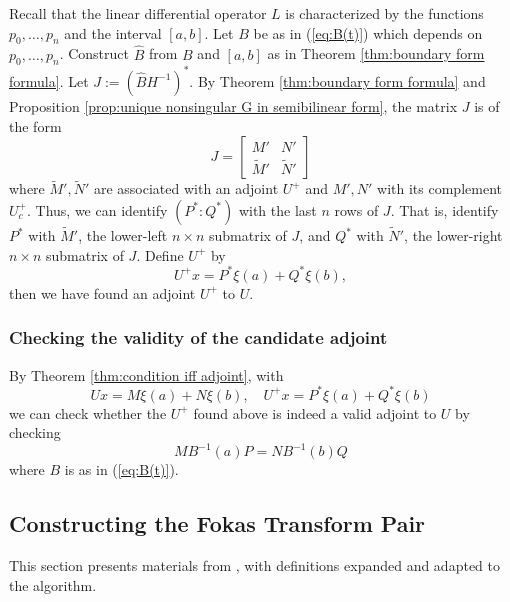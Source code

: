 \documentclass[11pt, oneside, a4paper]{article}
\begin{document}
Recall that the linear differential operator $L$ is characterized by the functions $p_0,\ldots,p_n$ and the interval $[a,b]$. Let $B$ be as in (\ref{eq:B(t)}) which depends on $p_0,\ldots,p_n$. Construct $\hat{B}$ from $B$ and $[a,b]$ as in Theorem \ref{thm:boundary form formula}. Let $J:=(\hat{B}H^{-1})^*$. By Theorem \ref{thm:boundary form formula} and Proposition \ref{prop:unique nonsingular G in semibilinear form}, the matrix $J$ is of the form
\[J=\begin{bmatrix}M' & N'\\ \tilde{M}' & \tilde{N}'\end{bmatrix}\]
where $\tilde{M}', \tilde{N}'$ are associated with an adjoint $U^+$ and $M', N'$ with its complement $U_c^+$.
Thus, we can identify $(P^*:Q^*)$ with the last $n$ rows of $J$. That is, identify $P^*$ with $\tilde{M}'$, the lower-left $n\times n$ submatrix of $J$, and $Q^*$ with $\tilde{N}'$, the lower-right $n\times n$ submatrix of $J$. Define $U^+$ by
\[U^+x = P^* \xi(a) + Q^* \xi(b),\]
then we have found an adjoint $U^+$ to $U$.

\subsubsection{Checking the validity of the candidate adjoint}
By Theorem \ref{thm:condition iff adjoint}, with
\begin{equation}\label{eq:adjointU}
    Ux = M\xi(a) + N\xi(b),\quad U^+x = P^* \xi(a) + Q^* \xi(b)
\end{equation}
we can check whether the $U^+$ found above is indeed a valid adjoint to $U$ by checking 
\[MB^{-1}(a)P = NB^{-1}(b)Q\]
where $B$ is as in (\ref{eq:B(t)}).

\subsection{Constructing the Fokas Transform Pair}\label{sec:fokas_transform_pair}

This section presents materials from \cite{Smith2016}, with definitions expanded and adapted to the algorithm.
\end{document}
